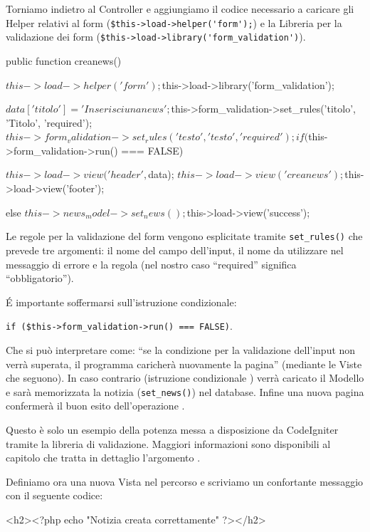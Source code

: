 Torniamo indietro al Controller  e aggiungiamo il codice necessario a caricare gli Helper relativi al form (\verb|$this->load->helper('form');|) e la Libreria per la validazione dei form (\verb|$this->load->library('form_validation')|).

\begin{code}
public function creanews()
{
	$this->load->helper('form');
	$this->load->library('form_validation');

	$data['titolo'] = 'Inserisci una news';

	$this->form_validation->set_rules('titolo', 'Titolo', 'required');
	$this->form_validation->set_rules('testo', 'testo', 'required');

	if ($this->form_validation->run() === FALSE)
	{
		$this->load->view('header', $data);
		$this->load->view('creanews');
		$this->load->view('footer');

	}
	else
	{
		$this->news_model->set_news();
		$this->load->view('success');
	}
}
\end{code}

Le regole per la validazione del form vengono esplicitate tramite \verb|set_rules()| che prevede tre argomenti: il nome del campo dell'input, il nome da utilizzare nel messaggio di errore e la regola (nel nostro caso ``required'' significa ``obbligatorio'').

\'E importante soffermarsi sull'istruzione condizionale: 

\verb|if ($this->form_validation->run() === FALSE)|. 

Che si può interpretare come: ``se la condizione per la validazione dell'input non verrà superata, il programma caricherà nuovamente la pagina'' (mediante le Viste che seguono). In caso contrario (istruzione condizionale ) verrà caricato il Modello e sarà memorizzata la notizia (\verb|set_news()|) nel database. Infine una nuova pagina confermerà il buon esito dell'operazione .

Questo è solo un esempio della potenza messa a disposizione da CodeIgniter tramite la libreria di validazione. Maggiori informazioni sono disponibili al capitolo che tratta in dettaglio l'argomento .

Definiamo ora una nuova Vista  nel percorso  e scriviamo un confortante messaggio con il seguente codice:

\begin{code}
<h2><?php echo "Notizia creata correttamente" ?></h2>
\end{code}

